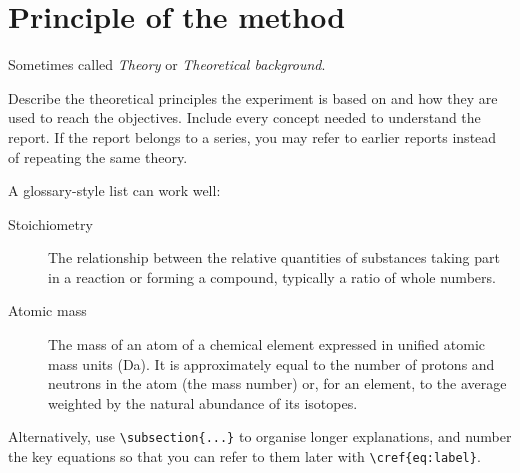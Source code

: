 \section{Principle of the method}
Sometimes called \emph{Theory} or \emph{Theoretical background}.

Describe the theoretical principles the experiment is based on and how they are used to reach the objectives. Include every concept needed to understand the report. If the report belongs to a series, you may refer to earlier reports instead of repeating the same theory.

A glossary-style list can work well:
\begin{description}
    \item[Stoichiometry] The relationship between the relative quantities of substances taking part in a reaction or forming a compound, typically a ratio of whole numbers.
    \item[Atomic mass] The mass of an atom of a chemical element expressed in unified atomic mass units (\unit{\dalton}). It is approximately equal to the number of protons and neutrons in the atom (the mass number) or, for an element, to the average weighted by the natural abundance of its isotopes.
\end{description}

Alternatively, use \verb|\subsection{...}| to organise longer explanations, and number the key equations so that you can refer to them later with \verb|\cref{eq:label}|.
